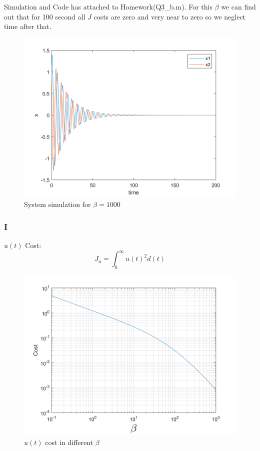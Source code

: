 Simulation and Code has attached to Homework(Q3\_b.m). For this $\beta$ we can find out that for 100 second all $J$ costs are zero and very near to zero so we neglect time after that.
\begin{figure}[H]
	\caption{System simulation for $\beta = 1000$}
	\centering
	\includegraphics[width=12cm]{../Code/Q3/figures/FinalBeta.png}
\end{figure}
\newpage
\subsubsection{I}
$u(t)$ Cost:
$$J_u = \int_{0}^{\infty} u(t)^2d(t)$$
\begin{figure}[H]
	\caption{$u(t)$ cost in different $\beta$}
	\centering
	\includegraphics[width=12cm]{../Code/Q3/figures/uCost.png}
\end{figure}
\newpage
